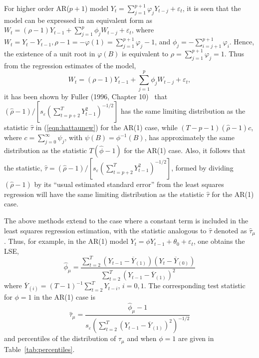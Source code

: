 For higher order AR($p+1$) model $Y_t = \sum_{j=1}^{p+1}\varphi_jY_{t-j} + \varepsilon_t$, it is seen that the model can be expressed in an equivalent form as $W_t = (\rho - 1)Y_{t-1} + \sum_{j=1}^p\phi_jW_{t-j} + \varepsilon_t$, where $W_t = Y_t - Y_{t-1}, \rho - 1 = -\varphi(1) = \sum_{j=1}^{p+1}\varphi_j - 1$, and $\phi_j = -\sum_{i=j+1}^{p+1}\varphi_i$. Hence, the existence of a unit root in $\varphi(B)$ is equivalent to $\rho = \sum_{j=1}^{p+1}\varphi_j = 1$. Thus from the regression estimates of the model, 
	\begin{equation}\label{eqn:wtnew}
	W_t  = (\rho - 1)Y_{t-1} + \sum_{j=1}^p\phi_jW_{t-j} + \varepsilon_t ,
	\end{equation}
it has been shown by Fuller (1996, Chapter 10)~\cite{fuller1996} that $(\hat{\rho} - 1)/[s_\varepsilon(\sum_{t=p+2}^TY_{t-1}^2)^{-1/2}]$ has the same limiting distribution as the statistic $\hat{\tau}$ in (\ref{eqn:hattaunew}) for the AR(1) case, while $(T- p - 1)(\hat{\rho} - 1)c$, where $c = \sum_{j=0}^\infty\psi_j$, with $\psi(B) = \phi^{-1}(B)$, has approximately the same distribution as the statistic $T(\hat{\phi} - 1)$ for the AR(1) case. Also, it follows that the statistic, $\hat{\tau}=(\hat{\rho} - 1)/[s_{\varepsilon}(\sum_{t=p+2}^T Y_{t-1}^2)^{-1/2}]$, formed by dividing $(\hat{\rho} - 1)$ by its ``usual estimated standard error'' from the least squares regression will have the same limiting distribution as the statistic $\hat{\tau}$ for the AR(1) case.


The above methods extend to the case where a constant term is included in the least squares regression estimation, with the statistic analogous to $\hat{\tau}$ denoted as $\hat{\tau}_\mu$. Thus, for example, in the AR(1) model $Y_t = \phi Y_{t-1} + \theta_0 + \varepsilon_t$, one obtains the LSE,
	\begin{equation}\label{eqn:hatphinewest}
	\widehat{\phi}_{\mu} = \dfrac{\sum_{t=2}^T(Y_{t-1} - \overline{Y}_{(1)})(Y_t - \overline{Y}_{(0)})}{\sum_{t=2}^T(Y_{t-1} - \overline{Y}_{(1)})^2}
	\end{equation}
where $\overline{Y}_{(i)} = (T - 1)^{-1}\sum_{t=2}^TY_{t-i}$, $i = 0,1$. The corresponding test statistic for $\phi = 1$ in the AR(1) case is
	\begin{equation}\label{eqn:anotherhattau}
	\hat{\tau}_\mu = \dfrac{\widehat{\phi}_\mu - 1}{s_{\varepsilon} \left( \sum_{t=2}^T(Y_{t-1} - \overline{Y}_{(1)})^2 \right)^{-1/2}}
	\end{equation}
and percentiles of the distribution of $\hat{\tau}_\mu$ and when $\phi = 1$ are given in Table~\ref{tab:percentiles}.


